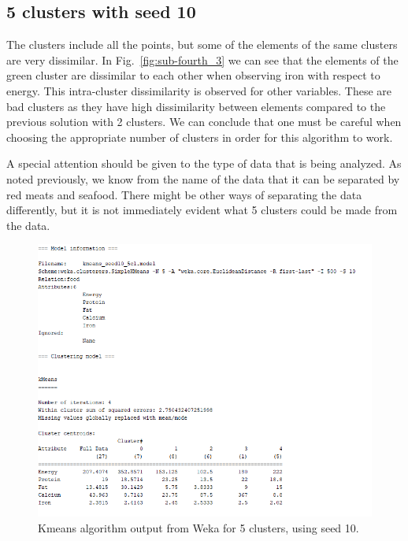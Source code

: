 \documentclass[letterpaper,12pt]{article}
\begin{document}
\subsection{5 clusters with seed 10}

The clusters include all the points, but some of the elements of the same clusters are very dissimilar. In Fig.~\ref{fig:sub-fourth_3} we can see that the elements of the green cluster are dissimilar to each other when observing iron with respect to energy. This intra-cluster dissimilarity is observed for other variables. These are bad clusters as they have high dissimilarity between elements compared to the previous solution with 2 clusters. We can conclude that one must be careful when choosing the appropriate number of clusters in order for this algorithm to work. 

A special attention should be given to the type of data that is being analyzed. As noted previously, we know from the name of the data that it can be separated by red meats and seafood. There might be other ways of separating the data differently, but it is not immediately evident what 5 clusters could be made from the data.

\begin{figure}[H] 
  \centering
      \includegraphics[width=0.5\columnwidth]{kmeans_seed10_5cl_output}

        \caption{
                \label{fig:kmeans_10_5_out}  
                Kmeans algorithm output from Weka for 5 clusters, using seed 10.
        }
\end{figure}
\end{document}

